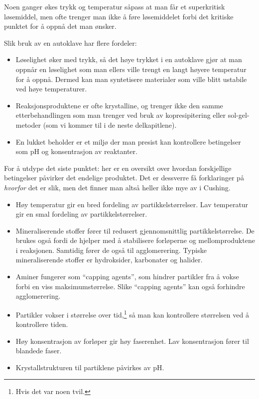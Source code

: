 Noen ganger økes trykk og temperatur såpass at man får et superkritisk løsemiddel, men ofte trenger man ikke å føre løsemiddelet forbi det kritiske punktet for å oppnå det man ønsker.

Slik bruk av en autoklave har flere fordeler:
\begin{itemize}
	\item Løselighet øker med trykk, så det høye trykket i en autoklave gjør at man oppnår en løselighet som man ellers ville trengt en langt høyere temperatur for å oppnå. Dermed kan man syntetisere materialer som ville blitt ustabile ved høye temperaturer.
	\item Reaksjonsproduktene er ofte krystalline, og trenger ikke den samme etterbehandlingen som man trenger ved bruk av kopresipitering eller sol-gel-metoder (som vi kommer til i de neste delkapitlene).
	\item En lukket beholder er et miljø der man presist kan kontrollere betingelser som pH og konsentrasjon av reaktanter.
\end{itemize}

For å utdype det siste punktet: her er en oversikt over hvordan forskjellige betingelser påvirker det endelige produktet. Det er dessverre få forklaringer på \emph{hvorfor} det er slik, men det finner man altså heller ikke mye av i Cushing.
\begin{itemize}
	\item Høy temperatur gir en bred fordeling av partikkelstørrelser. Lav temperatur gir en smal fordeling av partikkelstørrelser.
	\item Mineraliserende stoffer fører til redusert gjennomsnittlig partikkelstørrelse. De brukes også fordi de hjelper med å stabilisere forløperne og mellomproduktene i reaksjonen. Samtidig fører de også til agglomerering. Typiske mineraliserende stoffer er hydroksider, karbonater og halider.
	\item Aminer fungerer som ``capping agents'', som hindrer partikler fra å vokse forbi en viss maksimumstørrelse. Slike ``capping agents'' kan også forhindre agglomerering.
	\item Partikler vokser i størrelse over tid,\footnote{Hvis det var noen tvil.} så man kan kontrollere størrelsen ved å kontrollere tiden.
	\item Høy konsentrasjon av forløper gir høy faserenhet. Lav konsentrasjon fører til blandede faser.
	\item Krystallstrukturen til partiklene påvirkes av pH.
\end{itemize}

